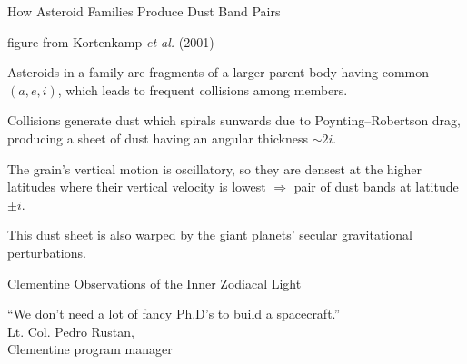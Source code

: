 \documentclass[20pt,35mmSlide,landscape]{foils}
\begin{document}
\vspace*{-12ex}\begin{center}
{\small How Asteroid Families Produce Dust Band Pairs}
\end{center}
\vspace*{-2ex}\parbox{10in}{
\parbox{8.5in}{
\begin{figure}[t]
\end{figure}
}
\hfil\parbox[c]{1.5in}{figure from Kortenkamp {\it et al.} (2001)
}
}
\parbox{10in}{\small
Asteroids in a family are fragments of a larger parent body
having common $(a,e,i)$, which leads to frequent collisions
among members.\vspace*{1ex}

Collisions generate dust which spirals sunwards due to
Poynting--Robertson drag, producing a sheet of dust having an
angular thickness $\sim2i$.\vspace*{0.8ex}

The grain's vertical motion is oscillatory, so they are densest
at the higher latitudes where their  vertical velocity is
lowest $\Rightarrow$ pair of dust bands at latitude
\vspace*{1ex}$\pm i$.\vspace*{0.7ex}

This dust sheet is also warped by the giant planets'
secular gravitational perturbations.
}

\newpage
\pagecolor{light-yellow}
\normalsize

\parbox{10in}{
\parbox{5.5in}{
\begin{figure}[t]
\vspace*{-6ex}
\end{figure}
}
\hfil\parbox[c]{4.0in}{
\begin{center}
{\large Clementine Observations of the Inner Zodiacal
Light\vspace*{0.6in}}
\end{center}

``We don't need a lot of fancy Ph.D's to build a
spacecraft.''\vspace*{2ex}\\
{\small Lt. Col. Pedro Rustan,\\
Clementine program manager}\vspace*{1in}
}
}
\end{document}
